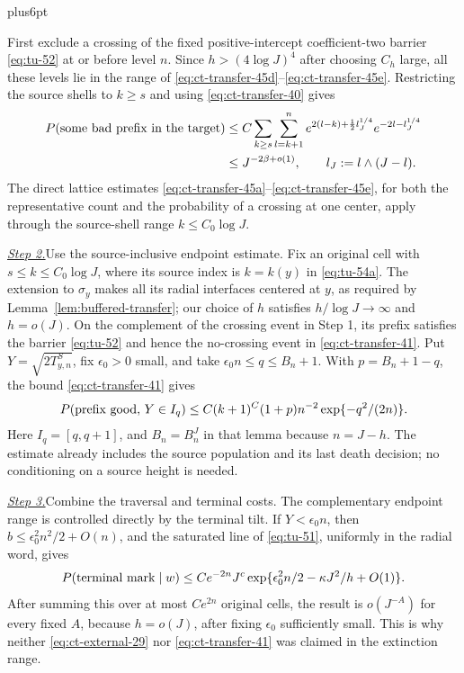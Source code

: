 \documentclass[12pt,reqno]{amsart}
\makeatletter
\theoremstyle{plain}
\theoremstyle{definition}
\theoremstyle{remark}
\renewenvironment{proof}[1][\proofname]{%
  \par
  \pushQED{\qed}%
  \normalfont
  \topsep6pt plus6pt\relax
  \trivlist
  \item[\hskip\labelsep\slshape #1\@addpunct{.}]%
  \ignorespaces
}{%
  \popQED
  \endtrivlist
  \@endpefalse
}
\DeclareRobustCommand{\qed}{%
  \leavevmode\unskip\penalty9999\hbox{}\nobreak
  \ifmmode
    \makebox[0pt][l]{\qquad\hbox{\qedsymbol}}%
  \else
    \qquad\hbox{\qedsymbol}%
  \fi
}
\renewcommand{\qedsymbol}{\rule[.47pt]{4pt}{6pt}}
\numberwithin{equation}{section}
\makeatother
\begin{document}
\begin{proof}[Proof of Proposition~\ref{prop:localized-disk-upper}]
First exclude a crossing of the fixed positive-intercept
coefficient-two barrier \eqref{eq:tu-52} at or before level \(n\).  Since
\(h>(4\log J)^4\) after choosing \(C_h\) large, all these levels lie in
the range of \eqref{eq:ct-transfer-45d}--\eqref{eq:ct-transfer-45e}.  Restricting the source shells to \(k\ge s\)
and using \eqref{eq:ct-transfer-40} gives
\begin{equation}
\begin{split}
 P(\hbox{some bad prefix in the target})
 &\le C\sum_{k\ge s}\sum_{l=k+1}^{n}
 e^{2(l-k)+\frac12 l_J^{1/4}}
 e^{-2l-l_J^{1/4}}\\
 &\le J^{-2\beta+o(1)},\qquad
 l_J:=l\wedge(J-l).                                          \end{split}
\label{eq:tu-55}
\end{equation}
The direct lattice estimates \eqref{eq:ct-transfer-45a}--\eqref{eq:ct-transfer-45e}, for both the representative
count and the probability of a crossing at one center, apply through the
source-shell range \(k\le C_0\log J\).

\smallskip\noindent
\underline{\textit{Step 2.}}\quad Use the source-inclusive endpoint estimate.
Fix an original cell with \(s\le k\le C_0\log J\), where its source index
is \(k=k(y)\) in \eqref{eq:tu-54a}. The extension to \(\sigma_y\) makes
all its radial interfaces centered at \(y\), as required by
Lemma~\ref{lem:buffered-transfer}; our choice of \(h\) satisfies
\(h/\log J\to\infty\) and \(h=o(J)\). On the complement of the crossing
event in Step 1, its prefix satisfies the barrier \eqref{eq:tu-52} and
hence the no-crossing event in \eqref{eq:ct-transfer-41}.
Put \(Y=\sqrt{2T^S_{y,n}}\), fix \(\epsilon_0>0\) small, and take
\(\epsilon_0n\le q\le B_n+1\). With \(p=B_n+1-q\), the bound
\eqref{eq:ct-transfer-41} gives
\begin{equation}
 P(\hbox{prefix good},\,Y\in I_q)
 \le C(k+1)^C(1+p)n^{-2}\exp\{-q^2/(2n)\}.                  \label{eq:tu-58}
\end{equation}
Here \(I_q=[q,q+1]\), and \(B_n=B_n^J\) in that lemma because
\(n=J-h\). The estimate already includes the source population and its
last death decision; no conditioning on a source height is needed.

\smallskip\noindent
\underline{\textit{Step 3.}}\quad Combine the traversal and terminal costs.
The complementary endpoint range is controlled directly by the terminal
tilt.  If
\(Y<\epsilon_0n\), then \(b\le\epsilon_0^2n^2/2+O(n)\), and the saturated
line of \eqref{eq:tu-51}, uniformly in the radial word, gives
\begin{equation}
 P(\hbox{terminal mark}\mid w)
 \le C e^{-2n}J^c
       \exp\{\epsilon_0^2n/2-\kappa J^2/h+O(1)\}.            \label{eq:tu-58a-2}
\end{equation}
After summing this over at most \(Ce^{2n}\) original cells, the result is
\(o(J^{-A})\) for every fixed \(A\), because \(h=o(J)\), after fixing
\(\epsilon_0\) sufficiently small.  This is why neither \eqref{eq:ct-external-29} nor \eqref{eq:ct-transfer-41}
was claimed in the extinction range.


\end{proof}
\end{document}
